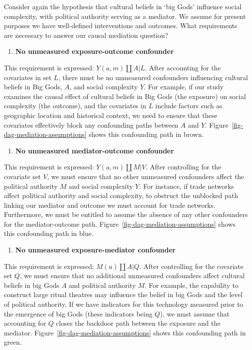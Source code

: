 \documentclass[
  singlecolumn]{article}
\providecommand{\tightlist}{%
  \setlength{\itemsep}{0pt}\setlength{\parskip}{0pt}}\usepackage{longtable,booktabs,array}
\begin{document}
Consider again the hypothesis that cultural beliefs in `big Gods'
influence social complexity, with political authority serving as a
mediator. We assume for present purposes we have well-defined
interventions and outcomes. What requirements are necessary to answer
our causal mediation question?

\begin{enumerate}
\def\labelenumi{\arabic{enumi}.}
\tightlist
\item
  \textbf{No unmeasured exposure-outcome confounder}
\end{enumerate}

This requirement is expressed: \(Y(a,m) \coprod A | L\). After
accounting for the covariates in set \(L\), there must be no unmeasured
confounders influencing cultural beliefs in Big Gods, \(A\), and social
complexity \(Y\). For example, if our study examines the causal effect
of cultural beliefs in Big Gods (the exposure) on social complexity (the
outcome), and the covariates in \(L\) include factors such as geographic
location and historical context, we need to ensure that these covariates
effectively block any confounding paths between \(A\) and \(Y\).
Figure~\ref{fig-dag-mediation-assumptions} shows this confounding path
in brown.

\begin{enumerate}
\def\labelenumi{\arabic{enumi}.}
\setcounter{enumi}{1}
\tightlist
\item
  \textbf{No unmeasured mediator-outcome confounder}
\end{enumerate}

This requirement is expressed: \(Y(a,m) \coprod M | V\). After
controlling for the covariate set \(V\), we must ensure that no other
unmeasured confounders affect the political authority \(M\) and social
complexity \(Y\). For instance, if trade networks affect political
authority and social complexity, to obstruct the unblocked path linking
our mediator and outcome we must account for trade networks.
Furthermore, we must be entitled to assume the absence of any other
confounders for the mediator-outcome path.
Figure~\ref{fig-dag-mediation-assumptions} shows this confounding path
in blue.

\begin{enumerate}
\def\labelenumi{\arabic{enumi}.}
\setcounter{enumi}{2}
\tightlist
\item
  \textbf{No unmeasured exposure-mediator confounder}
\end{enumerate}

This requirement is expressed: \(M(a) \coprod A | Q\). After controlling
for the covariate set \(Q\), we must ensure that no additional
unmeasured confounders affect cultural beliefs in big Gods \(A\) and
political authority \(M\). For example, the capability to construct
large ritual theatres may influence the belief in big Gods and the level
of political authority. If we have indicators for this technology
measured prior to the emergence of big Gods (these indicators being
\(Q\)), we must assume that accounting for \(Q\) closes the backdoor
path between the exposure and the mediator.
Figure~\ref{fig-dag-mediation-assumptions} shows this confounding path
in green.
\end{document}
